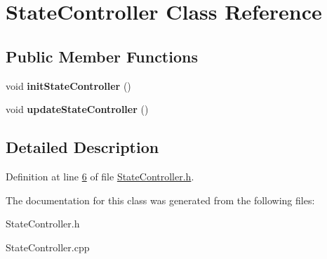 \hypertarget{class_state_controller}{}\section{State\+Controller Class Reference}
\label{class_state_controller}
\subsection*{Public Member Functions}
\begin{DoxyCompactItemize}
\item 
\mbox{\label{class_state_controller_a179258c5000de44f8a9b2b7dd0e63c68}} 
void {\bfseries init\+State\+Controller} ()
\item 
\mbox{\label{class_state_controller_aec80cee4bc03c82550b28795b275ff9a}} 
void {\bfseries update\+State\+Controller} ()
\end{DoxyCompactItemize}


\subsection{Detailed Description}


Definition at line \hyperlink{_state_controller_8h_source_l00006}{6} of file \hyperlink{_state_controller_8h_source}{State\+Controller.\+h}.



The documentation for this class was generated from the following files\+:\begin{DoxyCompactItemize}
\item 
State\+Controller.\+h\item 
State\+Controller.\+cpp\end{DoxyCompactItemize}
